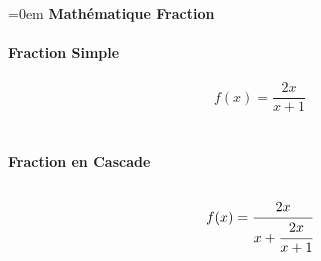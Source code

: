 \documentclass{article}
\begin{document}
\parindent=0em
\textbf{Mathématique Fraction} \\ \\
\textbf{Fraction Simple} \\ \\
$$f(x)=\frac{2x}{x+1}$$ \\ \\
\textbf{Fraction en Cascade} \\ \\
$$f(x)=\cfrac{2x}{x+\cfrac{2x}{x+1}}$$ \\ \\
\end{document}
